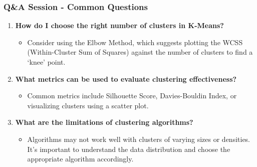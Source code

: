 \documentclass[aspectratio=169]{beamer}
\begin{document}
\begin{frame}[fragile]
  \frametitle{Q\&A Session - Common Questions}
  
  \begin{enumerate}
    \item \textbf{How do I choose the right number of clusters in K-Means?}
      \begin{itemize}
        \item Consider using the Elbow Method, which suggests plotting the WCSS (Within-Cluster Sum of Squares) against the number of clusters to find a ‘knee’ point.
      \end{itemize}
      
    \item \textbf{What metrics can be used to evaluate clustering effectiveness?}
      \begin{itemize}
        \item Common metrics include Silhouette Score, Davies-Bouldin Index, or visualizing clusters using a scatter plot.
      \end{itemize}
      
    \item \textbf{What are the limitations of clustering algorithms?}
      \begin{itemize}
        \item Algorithms may not work well with clusters of varying sizes or densities. It’s important to understand the data distribution and choose the appropriate algorithm accordingly.
      \end{itemize}
  \end{enumerate}
  
\end{frame}
\end{document}
